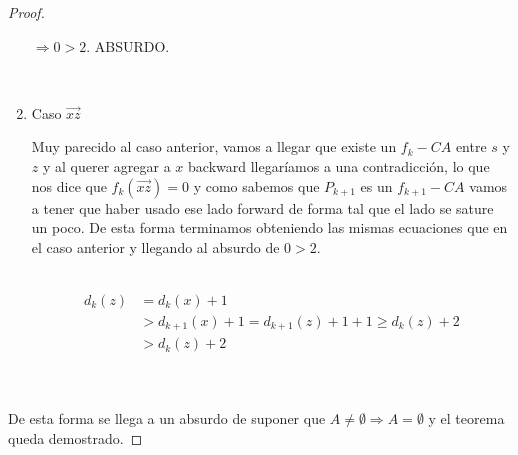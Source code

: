 \documentclass[11pt]{article}
\begin{document}
\begin{proof}
\begin{enumerate}
$ \Rightarrow 0 > 2$. ABSURDO. \par
\

\item Caso $\overrightarrow{xz}$\par
Muy parecido al caso anterior, vamos a llegar que existe un $f_k-CA$ entre $s$ y $z$ y al querer agregar a $x$ backward llegaríamos a una contradicción, lo que nos dice que $f_k(\overrightarrow{xz}) = 0$ y como sabemos que $P_{k+1}$ es un $f_{k+1} - CA$ vamos a tener que haber usado ese lado forward de forma tal que el lado se sature un poco. De esta forma terminamos obteniendo las mismas ecuaciones que en el caso anterior y llegando al absurdo de $0>2$.\par
\
\begin{align*}
d_k(z) & = d_k(x) + 1 \\
	   & > d_{k+1}(x) +1 = d_{k+1}(z) + 1 + 1 \ge d_k(z) + 2\\
	   & > d_k(z) + 2 \\
\end{align*}



\end{enumerate}\par
\

De esta forma se llega a un absurdo de suponer que $A \ne \emptyset \Rightarrow A = \emptyset$ y el teorema queda demostrado.

\end{proof}
\end{document}
